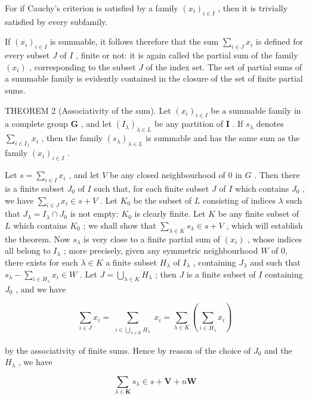 For if Cauchy's criterion is satisfied by a family \((x_{i})_{i\in I}\) , then it is trivially satisfied by every subfamily.

If \((x_{i})_{i\in I}\) is summable, it follows therefore that the sum \(\sum_{i\in J}x_{i}\) is defined for every subset \(J\) of \(I\) , finite or not: it is again called the partial sum of the family \((x_{i})\) , corresponding to the subset \(J\) of the index set. The set of partial sums of a summable family is evidently contained in the closure of the set of finite partial sums.

THEOREM 2 (Associativity of the sum). Let \((x_{i})_{i\in I}\) be a summable family in a complete group \(\mathbf{G}\) , and let \((I_{\lambda})_{\lambda \in L}\) be any partition of \(\mathbf{I}\) . If \(s_{\lambda}\) denotes \(\sum_{i\in I_{\lambda}}x_{i}\) , then the family \((s_{\lambda})_{\lambda \in L}\) is summable and has the same sum as the family \((x_{i})_{i\in I}\) .

Let \(s = \sum_{i \in I} x_i\) , and let \(V\) be any closed neighbourhood of 0 in \(G\) . Then there is a finite subset \(J_0\) of \(I\) such that, for each finite subset \(J\) of \(I\) which contains \(J_0\) , we have \(\sum_{i \in J} x_i \in s + V\) . Let \(K_0\) be the subset of \(L\) consisting of indices \(\lambda\) such that \(J_\lambda = I_\lambda \cap J_0\) is not empty: \(K_0\) is clearly finite. Let \(K\) be any finite subset of \(L\) which contains \(K_0\) ; we shall show that \(\sum_{\lambda \in K} s_\lambda \in s + V\) , which will establish the theorem. Now \(s_\lambda\) is very close to a finite partial sum of \((x_i)\) , whose indices all belong to \(I_\lambda\) ; more precisely, given any symmetric neighbourhood \(W\) of 0, there exists for each \(\lambda \in K\) a finite subset \(H_\lambda\) of \(I_\lambda\) , containing \(J_\lambda\) and such that \(s_\lambda - \sum_{i \in H_\lambda} x_i \in W\) . Let \(J = \bigcup_{\lambda \in K} H_\lambda\) ; then \(J\) is a finite subset of \(I\) containing \(J_0\) , and we have

\[
\sum_ {i \in J} x _ {i} = \sum_ {\substack {i \in \bigcup_ {\lambda \in K} H _ {\lambda}}} x _ {i} = \sum_ {\lambda \in K} (\sum_ {i \in H _ {\lambda}} x _ {i})
\]

by the associativity of finite sums. Hence by reason of the choice of \(J_{0}\) and the \(H_{\lambda}\) , we have

\[
\sum_ {\lambda \in \mathbf {K}} s _ {\lambda} \in s + \mathbf {V} + n \mathbf {W}
\]

